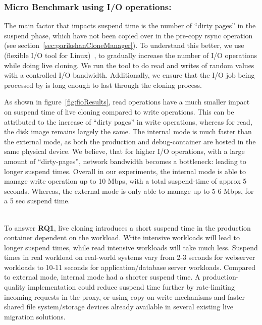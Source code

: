 \subsubsection{Micro Benchmark using I/O operations:}
The main factor that impacts suspend time is the number of ``dirty pages'' in the suspend phase, which have not been copied over in the pre-copy rsync operation (see section~\ref{sec:parikshanCloneManager}).
To understand this better, we use \fio (flexible I/O tool for Linux)~\cite{fio}, to gradually increase the number of I/O operations while doing live cloning.
We run the \fio tool to do read and writes of random values with a controlled I/O bandwidth. 
Additionally, we ensure that the I/O job being processed by \fio is long enough to last through the cloning process.

As shown in figure~\ref{fig:fioResults}, read operations have a much smaller impact on suspend time of live cloning compared to write operations.
This can be attributed to the increase of ``dirty pages'' in write operations, whereas for read, the disk image remains largely the same.
The internal mode is much faster than the external mode, as both the production and debug-container are hosted in the same physical device.
We believe, that for higher I/O operations, with a large amount of ``dirty-pages'', network bandwidth becomes a bottleneck: leading to longer suspend times.
Overall in our experiments, the internal mode is able to manage write operation up to 10 Mbps, with a total suspend-time of approx 5 seconds.
Whereas, the external mode is only able to manage up to 5-6 Mbps, for a 5 sec suspend time.\\ \\

\begin{tcolorbox}
	To answer \textbf{RQ1}, live cloning introduces a short suspend time in the production container dependent on the workload. 
	Write intensive workloads will lead to longer suspend times, while read intensive workloads will take much less. 
	Suspend times in real workload on real-world systems vary from 2-3 seconds for webserver workloads to 10-11 seconds for application/database server workloads. 
	Compared to external mode, internal mode had a shorter suspend time. 
	A production-quality implementation could reduce suspend time further by rate-limiting incoming requests in the proxy, or using copy-on-write mechanisms and faster shared file system/storage devices already available in several existing live migration solutions.
\end{tcolorbox}

